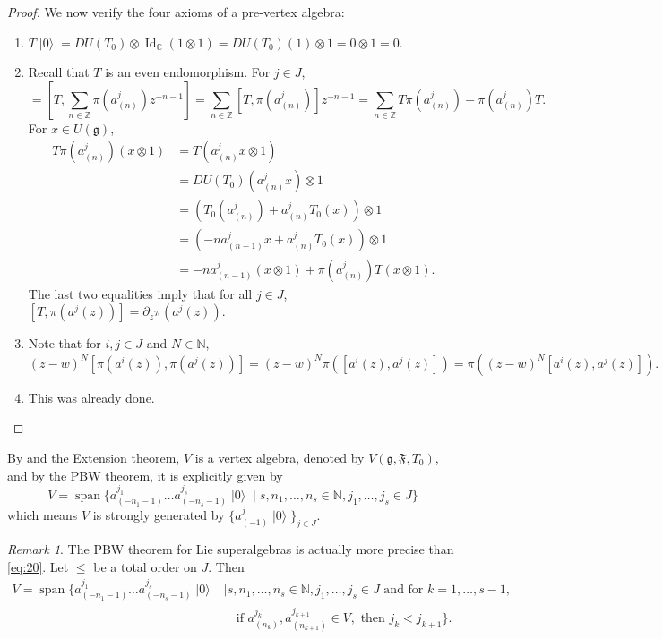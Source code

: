 \documentclass[a4paper, 12pt, reqno]{amsart}
\theoremstyle{remark}
\newtheorem{remark}[theorem]{Remark}
\numberwithin{equation}{subsection}
\DeclareMathOperator{\Id}{Id}
\DeclareMathOperator{\vspan}{span}
\DeclareMathOperator{\vac}{|0\rangle}
\DeclareMathOperator{\one}{\overline{1}}
\begin{document}
\begin{proof}
  We now verify the four axioms of a pre-vertex algebra:
  \begin{enumerate}
  \item $T\vac = DU(T_0)\otimes \Id_{\mathbb{C}}(1\otimes1) = DU(T_0)(1)\otimes1 = 0\otimes1 = 0$.
  \item Recall that $T$ is an even endomorphism.
    For $j \in J$,
    \begin{equation*}
      [T, \pi(a^j(z))] = \left[T, \sum_{n \in \mathbb{Z}}\pi(a^j_{(n)})z^{-n - 1}\right] = \sum_{n \in \mathbb{Z}}[T, \pi(a^j_{(n)})]z^{-n - 1} = \sum_{n \in \mathbb{Z}}T\pi(a^j_{(n)}) - \pi(a^j_{(n)})T.
    \end{equation*}
    For $x \in U(\mathfrak{g})$,
    \begin{align*}
      T\pi(a^j_{(n)})(x\otimes1) &= T(a^j_{(n)}x\otimes1) \\
      &= DU(T_0)(a^j_{(n)}x)\otimes1 \\
      &= (T_0(a^j_{(n)}) + a^j_{(n)}T_0(x))\otimes1 \\
      &= (-na^j_{(n - 1)}x + a^j_{(n)}T_0(x))\otimes1 \\
      &= -na^j_{(n - 1)}(x\otimes1) + \pi(a^j_{(n)})T(x\otimes 1).
    \end{align*}
    The last two equalities imply that for all $j \in J$, $[T, \pi(a^j(z))] = \partial_z\pi(a^j(z))$.
  \item Note that for $i, j \in J$ and $N \in \mathbb{N}$,
    \begin{equation*}
      (z - w)^N[\pi(a^i(z)), \pi(a^j(z))] = (z - w)^N\pi([a^i(z), a^j(z)]) = \pi((z - w)^N[a^i(z), a^j(z)]).
    \end{equation*}
  \item This was already done. \qedhere
  \end{enumerate}
\end{proof}

By  and the Extension theorem, $V$ is a vertex algebra, denoted by $V(\mathfrak{g}, \mathfrak{F}, T_0)$, and by the PBW theorem, it is explicitly given by
\begin{equation}
  \label{eq:20}
  V = \vspan\{a^{j_1}_{(-n_1 - 1)}\dots a^{j_s}_{(-n_s - 1)}\vac \mid s, n_1, \dots, n_s \in \mathbb{N}, j_1, \dots, j_s \in J\}
\end{equation}
which means $V$ is strongly generated by $\{a^j_{(-1)}\vac\}_{j \in J}$.

\begin{remark}
  \label{rmk:12}
  The PBW theorem for Lie superalgebras is actually more precise than \eqref{eq:20}.
  Let $\le$ be a total order on $J$.
  Then
  \begin{equation*}
    \begin{split}
      V = \vspan\{a^{j_1}_{(-n_1 - 1)}\dots a^{j_s}_{(-n_s - 1)}\vac &\mid s, n_1, \dots, n_s \in \mathbb{N}, j_1, \dots, j_s \in J\text{ and for } k = 1, \dots, s - 1,\\
      &\quad \text{if }a^{j_k}_{(n_k)},a^{j_{k + 1}}_{(n_{k + 1})} \in V_{\one},\text{ then }j_k < j_{k + 1}\}.
    \end{split}
  \end{equation*}
\end{remark}
\end{document}
